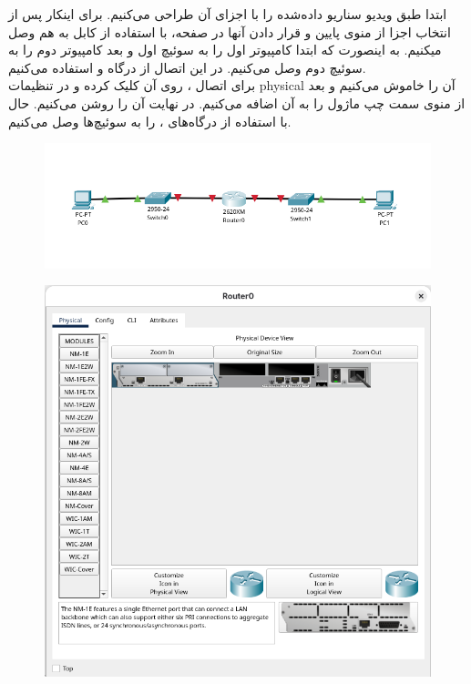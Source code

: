 
ابتدا طبق ویدیو سناریو داده‌شده را با اجزای آن طراحی می‌کنیم. برای اینکار پس از انتخاب اجزا از منوی پایین و قرار دادن آنها در صفحه، با استفاده از کابل   به هم وصل میکنیم. به اینصورت که ابتدا کامپیوتر اول را به سوئیچ اول و بعد کامپیوتر دوم را به سوئیچ دوم وصل می‌کنیم. در این اتصال از درگاه  و  استفاده می‌کنیم.
\\
برای اتصال ، روی آن کلیک کرده و در تنظیمات physical آن را خاموش می‌کنیم و بعد از منوی سمت چپ ماژول  را به آن اضافه می‌کنیم. در نهایت آن را روشن می‌کنیم. حال با استفاده از درگاه‌های ،  را به سوئیچ‌ها وصل می‌کنیم.
\begin{figure}[h]
    \centering
    \includegraphics[width=1\textwidth]{img/1.png}
\end{figure}
\begin{figure}[h]
    \centering
    \includegraphics[width=1\textwidth]{img/2.png}
\end{figure}
